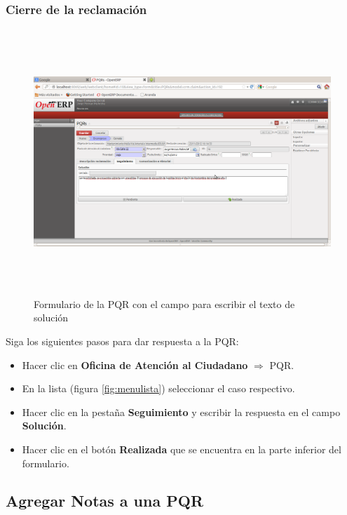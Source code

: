 \subsubsection{Cierre de la reclamación}


\begin{figure}
 \centering
 \includegraphics[width=17cm,height=10cm]{./Imagenes/formseguimiento.png}
 \caption{Formulario de la PQR con el campo para escribir el texto de solución}
 \label{fig:formseguimiento}
\end{figure}

Siga los siguientes pasos para dar respuesta a la PQR:

\begin{itemize}
 \item Hacer clic en \textbf{Oficina de Atención al Ciudadano} $\Rightarrow$ PQR.
 \item En la lista (figura \ref{fig:menulista}) seleccionar el caso respectivo.
 \item Hacer clic en la pestaña \textbf{Seguimiento} y escribir la respuesta en el campo \textbf{Solución}.
 \item Hacer clic en el botón \textbf{Realizada} que se encuentra en la parte inferior del formulario. 
\end{itemize}

\subsection{Agregar Notas a una PQR}


